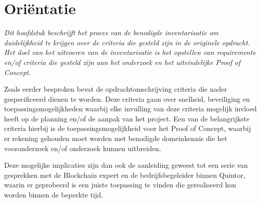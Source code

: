 \chapter{Oriëntatie}

\textit{Dit hoofdstuk beschrijft het proces van de benodigde inventarisatie om duidelijkheid te krijgen over de criteria die gesteld zijn in de originele opdracht. Het doel van het uitvoeren van de inventarisatie is het opstellen van requirements en/of criteria die gesteld zijn aan het onderzoek en het uiteindelijke Proof of Concept.}

Zoals eerder besproken bevat de opdrachtomschrijving criteria die nader gespecificeerd dienen te worden. Deze criteria gaan over snelheid, beveiliging en toepassingsmogelijkheden waarbij elke invulling van deze criteria mogelijk invloed heeft op de planning en/of de aanpak van het project. Een van de belangrijkste criteria hierbij is de toepassingsmogelijkheid voor het Proof of Concept, waarbij er rekening gehouden moet worden met benodigde domeinkennis die het vooronderzoek en/of onderzoek kunnen uitbreiden.

Deze mogelijke implicaties zijn dan ook de aanleiding geweest tot een serie van gesprekken met de Blockchain expert en de bedrijfsbegeleider binnen Quintor, waarin er geprobeerd is een juiste toepassing te vinden die gerealiseerd kon worden binnen de beperkte tijd.

